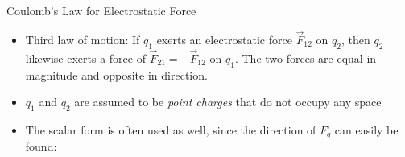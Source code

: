 \documentclass[12pt,aspectratio=169]{beamer}
\begin{document}
\begin{frame}{Coulomb's Law for Electrostatic Force}
  \begin{center}
  \end{center}
  \begin{itemize}
  \item Third law of motion: If $q_1$ exerts an electrostatic force
    $\vec F_{12}$ on $q_2$, then $q_2$ likewise exerts a force of
    $\vec F_{21}=-\vec F_{12}$ on $q_1$. The two forces are equal in magnitude
    and opposite in direction.
  \item $q_1$ and $q_2$ are assumed to be \emph{point charges} that do not
    occupy any space
  \item The scalar form is often used as well, since the direction of $F_q$ can
    easily be found:

  \end{itemize}
\end{frame}
\end{document}
